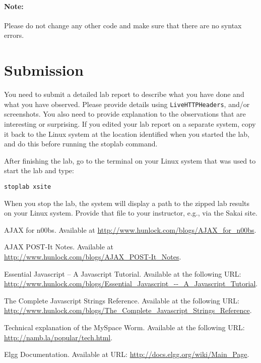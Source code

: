 \paragraph{Note:} Please do not change any other code and make sure that there are no syntax
errors.




\section{Submission}
You need to submit a detailed lab report to describe what you have
done and what you have observed. Please provide details using  
{\tt LiveHTTPHeaders},  and/or screenshots.
You also need to provide explanation
to the observations that are interesting or surprising.
If you edited your lab report on a separate system, copy it back to the Linux system at the location
identified when you started the lab, and do this before running the stoplab command.

After finishing the lab, go to the terminal on your Linux system that was used to start the lab and type:	
\begin{verbatim}
stoplab xsite
\end{verbatim}
When you stop the lab, the system will display a path to the zipped lab results on your Linux system.  Provide that file to 
your instructor, e.g., via the Sakai site.





\begin{thebibliography}{10}

\newblock AJAX for n00bs. Available at {\footnotesize \url{http://www.hunlock.com/blogs/AJAX_for_n00bs}}.

\newblock AJAX POST-It Notes.
\newblock Available at {\footnotesize \url{http://www.hunlock.com/blogs/AJAX_POST-It_Notes}}.

\newblock Essential Javascript -- A Javascript Tutorial.
\newblock Available at the following URL:\\
{\footnotesize \url{http://www.hunlock.com/blogs/Essential_Javascript_--_A_Javascript_Tutorial}}.

\newblock The Complete Javascript Strings Reference.
\newblock Available at the following URL:\\
{\footnotesize \url{http://www.hunlock.com/blogs/The_Complete_Javascript_Strings_Reference}}.

\newblock Technical explanation of the MySpace Worm.
\newblock Available at the following URL: \url{http://namb.la/popular/tech.html}.

\newblock Elgg Documentation. Available at URL: \url{http://docs.elgg.org/wiki/Main_Page}.

\end{thebibliography}


